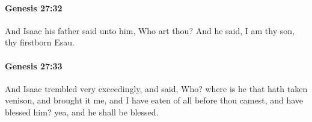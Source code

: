 		\paragraph{Genesis 27:32} %
			\label{GENESIS-27-32}

			And Isaac his father said unto him, Who art thou? And he said, I am thy son, thy firstborn Esau.


		\paragraph{Genesis 27:33} %
			\label{GENESIS-27-33}

			And Isaac trembled very exceedingly, and said, Who? where is he that hath taken venison, and brought it me, and I have eaten of all before thou camest, and have blessed him? yea, and he shall be blessed.


